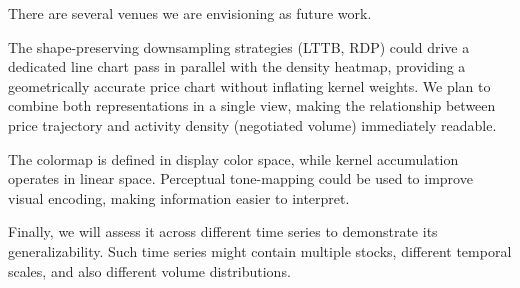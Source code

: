 \documentclass[10pt,conference]{IEEEtran}
\begin{document}
There are several venues we are envisioning as future work.

The shape-preserving downsampling strategies (LTTB, RDP) could drive a dedicated line chart pass in parallel with the density heatmap, providing a geometrically accurate price chart without inflating kernel weights. We plan to combine both representations in a single view, making the relationship between price trajectory and activity density (negotiated volume) immediately readable.

The colormap is defined in display color space, while kernel accumulation operates in linear space. Perceptual tone-mapping could be used to improve visual encoding, making information easier to interpret.

Finally, we will assess it across different time series to demonstrate its generalizability. Such time series might contain multiple stocks, different temporal scales, and also different volume distributions.







%
%





\end{document}
